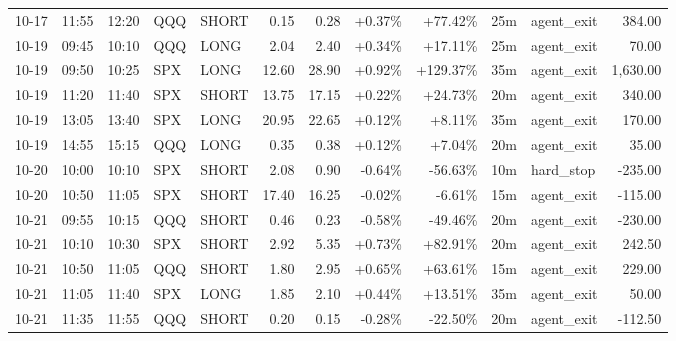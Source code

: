 \documentclass[11pt,a4paper]{article}
\begin{document}
\begin{center}
\begin{longtable}{>{\color{txtmain}}l l l l l r r r r r >{\color{txtmain}}l r}
10-17 & 11:55 & 12:20 & QQQ & SHORT & 0.15 & 0.28 & \textcolor{wingreen}{+0.37\%} & \textcolor{wingreen}{+77.42\%} & 25m & agent\_exit & \textcolor{wingreen}{384.00} \\
10-19 & 09:45 & 10:10 & QQQ & LONG & 2.04 & 2.40 & \textcolor{wingreen}{+0.34\%} & \textcolor{wingreen}{+17.11\%} & 25m & agent\_exit & \textcolor{wingreen}{70.00} \\
10-19 & 09:50 & 10:25 & SPX & LONG & 12.60 & 28.90 & \textcolor{wingreen}{+0.92\%} & \textcolor{wingreen}{+129.37\%} & 35m & agent\_exit & \textcolor{wingreen}{1,630.00} \\
10-19 & 11:20 & 11:40 & SPX & SHORT & 13.75 & 17.15 & \textcolor{wingreen}{+0.22\%} & \textcolor{wingreen}{+24.73\%} & 20m & agent\_exit & \textcolor{wingreen}{340.00} \\
10-19 & 13:05 & 13:40 & SPX & LONG & 20.95 & 22.65 & \textcolor{wingreen}{+0.12\%} & \textcolor{wingreen}{+8.11\%} & 35m & agent\_exit & \textcolor{wingreen}{170.00} \\
10-19 & 14:55 & 15:15 & QQQ & LONG & 0.35 & 0.38 & \textcolor{wingreen}{+0.12\%} & \textcolor{wingreen}{+7.04\%} & 20m & agent\_exit & \textcolor{wingreen}{35.00} \\
10-20 & 10:00 & 10:10 & SPX & SHORT & 2.08 & 0.90 & \textcolor{lossred}{-0.64\%} & \textcolor{lossred}{-56.63\%} & 10m & hard\_stop & \textcolor{lossred}{-235.00} \\
10-20 & 10:50 & 11:05 & SPX & SHORT & 17.40 & 16.25 & \textcolor{lossred}{-0.02\%} & \textcolor{lossred}{-6.61\%} & 15m & agent\_exit & \textcolor{lossred}{-115.00} \\
10-21 & 09:55 & 10:15 & QQQ & SHORT & 0.46 & 0.23 & \textcolor{lossred}{-0.58\%} & \textcolor{lossred}{-49.46\%} & 20m & agent\_exit & \textcolor{lossred}{-230.00} \\
10-21 & 10:10 & 10:30 & SPX & SHORT & 2.92 & 5.35 & \textcolor{wingreen}{+0.73\%} & \textcolor{wingreen}{+82.91\%} & 20m & agent\_exit & \textcolor{wingreen}{242.50} \\
10-21 & 10:50 & 11:05 & QQQ & SHORT & 1.80 & 2.95 & \textcolor{wingreen}{+0.65\%} & \textcolor{wingreen}{+63.61\%} & 15m & agent\_exit & \textcolor{wingreen}{229.00} \\
10-21 & 11:05 & 11:40 & SPX & LONG & 1.85 & 2.10 & \textcolor{wingreen}{+0.44\%} & \textcolor{wingreen}{+13.51\%} & 35m & agent\_exit & \textcolor{wingreen}{50.00} \\
10-21 & 11:35 & 11:55 & QQQ & SHORT & 0.20 & 0.15 & \textcolor{lossred}{-0.28\%} & \textcolor{lossred}{-22.50\%} & 20m & agent\_exit & \textcolor{lossred}{-112.50} \\

\end{longtable}
\end{center}
\end{document}
